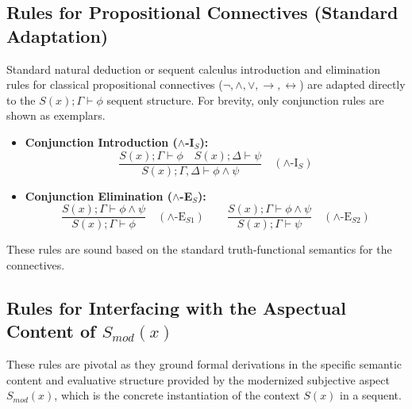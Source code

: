 \documentclass[
    12pt,              %
    a4paper,           %
    headings=normal,   %
    twoside=true,      %
    BCOR=8mm,          %
]{scrbook}
\begin{document}
\subsection{Rules for Propositional Connectives (Standard Adaptation)}
\label{sec:ch1_sequent_prop_connectives} 

Standard natural deduction or sequent calculus introduction and elimination rules for classical propositional connectives (\(\neg, \land, \lor, \rightarrow, \leftrightarrow\)) are adapted directly to the \(S(x); \Gamma \vdash \phi\) sequent structure. For brevity, only conjunction rules are shown as exemplars.

\begin{itemize}
    \item   \textbf{Conjunction Introduction (\(\land\)-I\(_S\)):}
    \[ \frac{S(x); \Gamma \vdash \phi \quad S(x); \Delta \vdash \psi}{S(x); \Gamma, \Delta \vdash \phi \land \psi} \quad (\land\text{-I}_S) \]
    \item   \textbf{Conjunction Elimination (\(\land\)-E\(_S\)):}
    \[ \frac{S(x); \Gamma \vdash \phi \land \psi}{S(x); \Gamma \vdash \phi} \quad (\land\text{-E}_{S1}) \qquad
       \frac{S(x); \Gamma \vdash \phi \land \psi}{S(x); \Gamma \vdash \psi} \quad (\land\text{-E}_{S2})
    \]
\end{itemize}
These rules are sound based on the standard truth-functional semantics for the connectives.

\subsection{Rules for Interfacing with the Aspectual Content of \(S_{mod}(x)\)}
\label{sec:ch1_sequent_interface_smod} 

These rules are pivotal as they ground formal derivations in the specific semantic content and evaluative structure provided by the modernized subjective aspect \(S_{mod}(x)\), which is the concrete instantiation of the context \(S(x)\) in a sequent.
\end{document}
